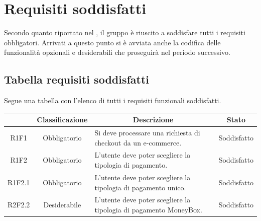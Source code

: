 \section{Requisiti soddisfatti}\label{section:requisiti_soddisfatti}
Secondo quanto riportato nel \docNameVersionPdP{}, il gruppo \groupName{} è riuscito a soddisfare tutti i requisiti obbligatori.
Arrivati a questo punto si è avviata anche la codifica delle funzionalità opzionali e desiderabili che proseguirà nel periodo successivo.
\subsection{Tabella requisiti soddisfatti}
Segue una tabella con l'elenco di tutti i requisiti funzionali soddisfatti.

\begin{table}[H]
    \centering
    \renewcommand{\arraystretch}{1.8}
    \begin{tabular}{c | c | p{6cm} | c }
        \rowcolor[HTML]{125E28}
        \multicolumn{1}{c}{\color[HTML]{FFFFFF} \textbf{Codice}}          &
        \multicolumn{1}{c}{\color[HTML]{FFFFFF} \textbf{Classificazione}} &
        \multicolumn{1}{c}{\color[HTML]{FFFFFF} \textbf{Descrizione}}     &
        \multicolumn{1}{c}{\color[HTML]{FFFFFF} \textbf{Stato}}                                                                                                                                                                  \\
        \hline
        R1F1                                                              & Obbligatorio & Si deve processare una richiesta di checkout da un e-commerce\glo{}.                          & Soddisfatto                        \\
        R1F2                                                              & Obbligatorio & L'utente deve poter scegliere la tipologia di pagamento.                                      & Soddisfatto        \\
        R1F2.1                                                            & Obbligatorio & L'utente deve poter scegliere la tipologia di pagamento unico.                                & Soddisfatto      \\
        R2F2.2                                                            & Desiderabile & L'utente deve poter scegliere la tipologia di pagamento MoneyBox\glo{}.                       & Soddisfatto      \\

\end{tabular}
\end{table}
